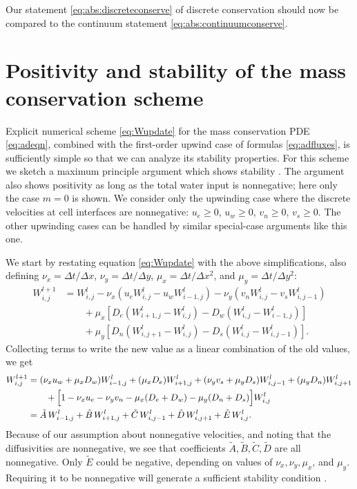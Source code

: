 \documentclass[11pt,final]{amsart}
\newcommand{\Wlij}{W^l_{i,j}}
\begin{document}
\begin{enumerate}
Our statement \eqref{eq:abs:discreteconserve} of discrete conservation should now be compared  to the continuum statement \eqref{eq:abs:continuumconserve}.
\end{enumerate}


\section{Positivity and stability of the mass conservation scheme} \label{app:positivestable}

Explicit numerical scheme \eqref{eq:Wupdate} for the mass conservation PDE \eqref{eq:adeqn}, combined with the first-order upwind case of formulas \eqref{eq:adfluxes}, is sufficiently simple so that we can analyze its stability properties.  For this scheme we sketch a maximum principle argument which shows stability \citep{MortonMayers}.  The argument also shows positivity \citep{HundsdorferVerwer2010} as long as the total water input is nonnegative; here only the case $m = 0$ is shown.  We consider only the upwinding case where the discrete velocities at cell interfaces are nonnegative: $u_e\ge 0$, $u_w\ge 0$, $v_n\ge 0$, $v_s\ge 0$.  The other upwinding cases can be handled by similar special-case arguments like this one.

We start by restating equation \eqref{eq:Wupdate} with the above simplifications, also defining $\nu_x = \Delta t/\Delta x$, $\nu_y = \Delta t/\Delta y$, $\mu_x = \Delta t/\Delta x^2$, and $\mu_y = \Delta t/\Delta y^2$:
\begin{align*}
 W_{i,j}^{l+1} &= \Wlij - \nu_x \left(u_e \Wlij - u_w W_{i-1,j}^l\right) - \nu_y \left(v_n \Wlij - v_s W_{i,j-1}^l\right)  \\
      &\qquad + \mu_x \left[D_e \left(W_{i+1,j}^l - \Wlij\right) - D_w \left(\Wlij - W_{i-1,j}^l\right)\right]  \\
      &\qquad + \mu_y \left[D_n \left(W_{i,j+1}^l - \Wlij\right) - D_s \left(\Wlij - W_{i,j-1}^l\right)\right].
\end{align*}
Collecting terms to write the new value as a linear combination of the old values, we get
\begin{align}
 W_{i,j}^{l+1} &= (\nu_x u_w + \mu_x D_w) W_{i-1,j}^l + (\mu_x D_e) W_{i+1,j}^l + (\nu_y v_s + \mu_y D_s) W_{i,j-1}^l + (\mu_y D_n) W_{i,j+1}^l  \notag \\
      &\qquad + \Big[1 - \nu_x u_e - \nu_y v_n - \mu_x (D_e + D_w) - \mu_y (D_n + D_s)\Big] \Wlij \notag \\
  &= \tilde A\, W_{i-1,j}^l + \tilde B\, W_{i+1,j}^l + \tilde C\, W_{i,j-1}^l + \tilde D\, W_{i,j+1}^l + \tilde E\, \Wlij. \label{eq:lincomb}
\end{align}
Because of our assumption about nonnegative velocities, and noting that the diffusivities are nonnegative, we see that coefficients $\tilde A,\tilde B,\tilde C,\tilde D$ are all nonnegative.  Only $\tilde E$ could be negative, depending on values of $\nu_x, \nu_y, \mu_x$, and $\mu_y$.  Requiring it to be nonnegative will generate a sufficient stability condition \citep{MortonMayers}.
\end{document}
